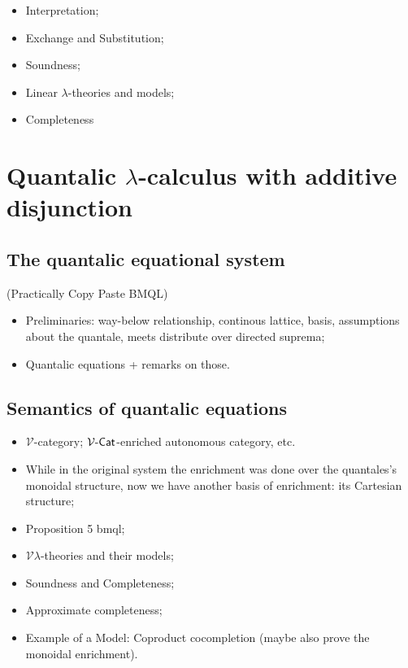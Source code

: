 \documentclass[10pt,a4paper]{amsart}
\theoremstyle{definition}
\theoremstyle{definition}
\theoremstyle{definition}
\theoremstyle{definition}
\theoremstyle{definition}
\theoremstyle{definition}
\begin{document}
\begin{itemize}
  \item Interpretation;
  \item Exchange and Substitution;
  \item Soundness;
  \item Linear $\lambda$-theories and models;
  \item Completeness
\end{itemize}

\section{Quantalic $\lambda$-calculus with additive disjunction}

\subsection{The quantalic equational system}

(Practically Copy Paste BMQL)

\begin{itemize}
  \item Preliminaries: way-below relationship, continous lattice, basis, assumptions about the quantale, meets distribute over directed suprema;
  \item Quantalic equations + remarks on those.
\end{itemize}

\subsection{Semantics of quantalic equations}
\begin{itemize}
  \item $\mathcal{V}$-category; $\mathcal{V}\text{-}\mathsf{Cat}$-enriched autonomous category, etc.
  \item While in the original system the enrichment was done over the
 quantales’s monoidal structure, now we have another
 basis of enrichment: its Cartesian structure;
  \item Proposition 5 bmql;
  \item $\mathcal{V}\lambda$-theories and their models;
  \item Soundness and Completeness;
  \item Approximate completeness;
  \item Example of a Model: Coproduct cocompletion (maybe also prove the monoidal enrichment).
\end{itemize}
\end{document}
